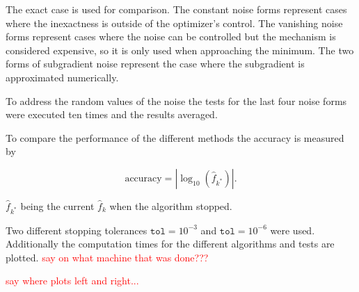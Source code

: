 The exact case is used for comparison. The constant noise forms represent cases where the inexactness is outside of the optimizer's control. The vanishing noise forms represent cases where the noise can be controlled  but the mechanism is considered expensive, so it is only used when approaching the minimum.
The two forms of subgradient noise represent the case where the subgradient is approximated numerically.

To address the random values of the noise the tests for the last four noise forms were executed ten times and the results averaged.

To compare the performance of the different methods the accuracy is measured by

\[ \text{accuracy} = |\log_{10}(\hat{f}_{k^*})|. \]

\(\hat{f}_{k^*}\) being the current \(\hat{f}_k\) when the algorithm stopped.

Two different stopping tolerances \(\mathtt{tol}=10^{-3}\) and \(\mathtt{tol}=10^{-6}\) were used.
Additionally the computation times for the different algorithms and tests are plotted. \textcolor{red}{say on what machine that was done???}



\textcolor{red}{say where plots left and right...}

